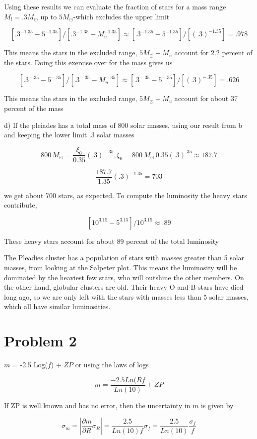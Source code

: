 \documentclass[12pt]{article}
\begin{document}
Using these results we can evaluate the fraction of stars for a mass range $M_{l} = .3M_{\odot}$ up to $5M_{\odot}$-which excludes the upper limit

$$ [.3^{-1.35} - 5^{-1.35}] / [.3^{-1.35} - M_{u}^{-1.35}] \approx [.3^{-1.35} - 5^{-1.35}] / [(.3)^{-1.35}] = .978 $$

This means the stars in the excluded range, $5M_{\odot} - M_{u}$ account for 2.2 percent of the stars. Doing this exercise over for the mass gives us

$$ [.3^{-.35} - 5^{-.35}] / [.3^{-.35} - M_{u}^{-.35}] \approx [.3^{-.35} - 5^{-.35}] / [(.3)^{-.35}] = .626 $$

This means the stars in the excluded range, $5M_{\odot} - M_{u}$ account for about 37 percent of the mass

d) If the pleiades has a total mass of 800 solar masses, using our result from b and keeping the lower limit .3 solar masses

$$ 800 \, M_{\odot} = \frac{\xi_{0}}{0.35} (.3)^{-.35}, \xi_{0} = 800 \, M_{\odot} \,0.35(.3)^{.35} \approx 187.7 $$

$$ \frac{187.7}{1.35} (.3)^{-1.35} = 703$$

we get about 700 stars, as expected. To compute the luminosity the heavy stars contribute,

$$[10^{3.15} - 5^{3.15}] / 10^{3.15} \approx .89 $$

These heavy stars account for about 89 percent of the total luminosity

The Pleadies cluster has a population of stars with masses greater than 5 solar masses, from looking at the Salpeter plot. This means the luminosity will be dominated by the heaviest few stars, who will outshine the other members. On the other hand, globular clusters are old. Their heavy O and B stars have died long ago, so we are only left with the stars with masses less than 5 solar masses, which all have similar luminosities.

\section{Problem 2}

$m$ = -2.5 Log($f$) + $ZP$ or using the laws of logs

$$ m = \frac{-2.5 Ln(Rf}{Ln(10)} + ZP $$

If ZP is well known and has no error, then the uncertainty in $m$ is given by

$$\sigma_{m} = |\frac{\partial m}{\partial R}  \sigma_{R}| = \frac{2.5}{Ln(10)f}  \sigma_{f} = \frac{2.5}{Ln(10)} \frac{\sigma_{f}}{f}$$
\end{document}
